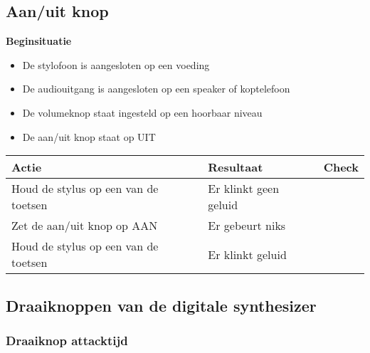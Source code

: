 \documentclass[12pt, a4paper, dutch]{article}
\newcommand{\cb}{\Square}
\newcommand{\stroom}{De stylofoon is aangesloten op een voeding}
\newcommand{\audio}{De audiouitgang is aangesloten op een speaker of koptelefoon}
\newcommand{\vol}{De volumeknop staat ingesteld op een hoorbaar niveau}
\begin{document}
\subsection{Aan/uit knop}

\begin{minipage}{\textwidth}
\textbf{Beginsituatie}
\begin{itemize}
	\item \stroom
	\item \audio
	\item \vol
	\item De aan/uit knop staat op UIT
\end{itemize}

\medskip

\begin{tabularx}{\textwidth}{p{}p{}>{\raggedleft\arraybackslash}X}
\toprule
\textbf{Actie} & \textbf{Resultaat} & \textbf{Check}\\
\midrule
Houd de stylus op een van de toetsen &
Er klinkt geen geluid &
\cb\\

Zet de aan/uit knop op AAN &
Er gebeurt niks &
\cb\\

Houd de stylus op een van de toetsen &
Er klinkt geluid &
\cb\\
\bottomrule
\end{tabularx}
\end{minipage}

\subsection{Draaiknoppen van de digitale synthesizer}

\subsubsection{Draaiknop attacktijd}
\end{document}
